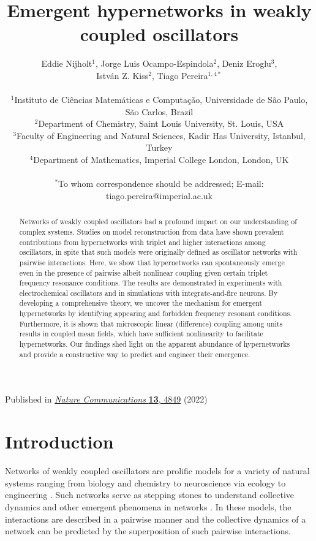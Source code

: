 \documentclass[12pt]{article}
\title{Emergent hypernetworks in weakly coupled oscillators  
}
\author
{Eddie Nijholt$^{1}$, Jorge Luis  Ocampo-Espindola$^{2}$,  Deniz Eroglu$^{3}$, \\ Istv\'{a}n Z. Kiss$^{2}$,  Tiago Pereira$^{1,4\ast}$\\
\\
\normalsize{$^{1}$Instituto de Ci\^encias Matem\'aticas e Computa\c{c}\~ao, Universidade de S\~ao Paulo, S\~ao Carlos, Brazil}\\
\normalsize{$^{2}$Department of Chemistry, Saint Louis University, St. Louis, USA}\\
\normalsize{$^{3}$Faculty of Engineering and Natural Sciences, Kadir Has University, Istanbul, Turkey}\\
\normalsize{$^{4}$Department of Mathematics, Imperial College London, London, UK}\\
\\
\normalsize{$^\ast$To whom correspondence should be addressed; E-mail:  tiago.pereira@imperial.ac.uk}
}
\date{}
\theoremstyle{plain}
\theoremstyle{definition}
\theoremstyle{remark}
\theoremstyle{remark}
\begin{document}
 



\baselineskip24pt



\maketitle 


\begin{abstract}
{

Networks of weakly coupled oscillators had a profound impact on our understanding of complex systems.  Studies on model reconstruction from data have shown prevalent contributions from hypernetworks with triplet and higher interactions among oscillators, in spite that such models were originally  defined as oscillator networks with pairwise interactions. Here, we show that hypernetworks  can spontaneously emerge even in the presence of pairwise albeit nonlinear coupling given certain triplet frequency resonance conditions. The results are demonstrated in experiments with electrochemical oscillators and in simulations with integrate-and-fire neurons. By developing a comprehensive theory, we uncover the mechanism for emergent hypernetworks by identifying appearing and forbidden frequency resonant conditions. Furthermore, it is shown that microscopic linear (difference) coupling among units results in coupled mean fields, which have sufficient nonlinearity to facilitate hypernetworks. Our findings shed light on the apparent abundance of hypernetworks and provide a constructive way to predict and engineer their emergence.}
\end{abstract}

\vspace{10pt}
\begin{center}
\small Published in \href{doi.org/10.1038/s41467-022-32282-4}{\textit{Nature Communications} \textbf{13}, 4849} (2022)
\end{center}

\baselineskip18pt

\clearpage



\section*{Introduction}
Networks of weakly coupled oscillators are prolific models for a variety of natural systems ranging from biology \cite{Watts2011,kralemann2013vivo} and chemistry \cite{sebek2016complex, bick2017robust} to neuroscience \cite{Nat2,Ermentrout:10} via ecology \cite{blasius1999complex} to engineering \cite{matheny2019exotic}. Such networks serve as stepping stones to understand collective dynamics \cite{Smeal:10,Omel:12,Hong:11,kuramoto2003chemical} and other  emergent phenomena in networks \cite{Stankovski_RMP_2017,rodrigues2016kuramoto}. In these models, the interactions are described in a pairwise manner and the collective dynamics of a network can be predicted by the superposition of such pairwise interactions. 
\end{document}
